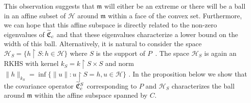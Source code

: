 \documentclass[AHL,Unicode,longabstracts,published]{cedram}
\theoremstyle{remark}
\newcommand{\restrr}
{\!\!\upharpoonright\!\!}
\newcommand{\cH}{\mathcal{H}}
\newcommand{\fkC}{\mathfrak{C}}
\newcommand{\mean}{\mathfrak{m}}
\let\oldtilde\tilde
\renewcommand*{\tilde}[1]{\mathchoice{\widetilde{#1}}{\widetilde{#1}}{\oldtilde{#1}}{\oldtilde{#1}}}
\begin{document}
This observation suggests that $\mean$ will either be an extreme or there will be a ball in an affine subset of $\cH$ around $\mean$ within a face of the convex set. Furthermore, we can hope that this affine subspace is directly related to the non-zero eigenvalues of $\tilde{\fkC}_c$ and that these eigenvalues characterize a lower bound on the width of this ball. Alternatively, it is natural to consider the space $\cH_S = \{ h\restrr S : h \in \cH \}$ where $S$ is the support of $P$~\cite[Definition~411N]{FREM}. The space $\cH_S$ is again an RKHS with kernel $k_S = k\restrr S \times S$ and norm $\|h\|_{k_S} = \inf\{\|u\| : u \restrr S = h, u \in \cH\}$ \cite[Corollary~5.8]{PAUL16}. In the proposition below we show that the covariance operator $\tilde{\fkC}_c^S$ corresponding to $P$ and $\cH_S$ characterizes the ball around $\mean$ within the affine subspace spanned by $C$.
\end{document}
